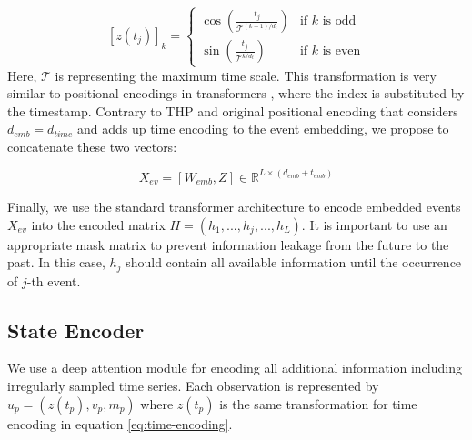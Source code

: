\documentclass[journal,twoside,web]{ieeecolor}
\begin{document}
\begin{equation}\label{eq:time-encoding}
    [z(t_j)]_{k} = 
     \begin{cases} 
        \cos\left(  \frac{t_j}{\mathcal{T}^{(k-1)/d_t} }  \right) & \text{if } k \text{ is odd}\\
        \sin\left(  \frac{t_j}{\mathcal{T}^{k/d_t} }  \right) & \text{if } k \text{ is even}

        \end{cases} 
\end{equation} 
Here, $\mathcal{T}$ is representing the maximum time scale. This transformation is very similar to positional encodings in transformers \cite*{vaswaniAttentionAllYou2017}, where the index is substituted by the timestamp. Contrary to THP and original positional encoding that considers $d_{emb}=d_{time}$ and adds up time encoding to the event embedding, we propose to concatenate these two vectors:

\begin{equation}
    X_{ev}=[W_{emb}, Z] \in \mathbb{R}^{L \times (d_{emb}+t_{emb})}
\end{equation}




Finally, we use the standard transformer architecture to encode embedded events $X_{ev}$ into the encoded matrix  $ H=(h_1, ..., h_j, ..., h_L) $. It is important to use an appropriate mask matrix to prevent information leakage from the future to the past. In this case, $h_j$ should contain all available information until the occurrence of $j$-th event.






\subsection{State Encoder}

We use a deep attention module \cite*{hornSetFunctionsTime2020} for encoding all additional information including irregularly sampled time series. Each observation is represented by $u_p=(z(t_p), v_p, m_p)$ where $z(t_p)$ is the same transformation for time encoding in equation \ref{eq:time-encoding}.%
\end{document}
